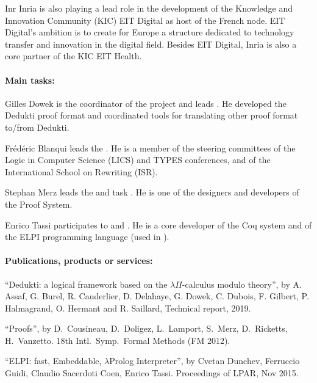 \begin{sitedescription}{Inr}
Inria is also playing a lead role in the development of the Knowledge and Innovation Community (KIC) EIT Digital as host of the French node. EIT Digital’s ambition is to create for Europe a structure dedicated to technology transfer and innovation in the digital field. Besides EIT Digital, Inria is also a core partner of the KIC EIT Health.

\paragraph*{Main tasks:}


\begin{compactitem}
\item Gilles Dowek is the coordinator of the project and leads
  . He developed the Dedukti proof format and
  coordinated tools for translating other proof format to/from
  Dedukti.
\item Frédéric Blanqui leads the . He is a member of the
  steering committees of the Logic in Computer Science (LICS) and
  TYPES conferences, and of the International School on Rewriting
  (ISR).
\item Stephan Merz leads the  and task .
  He is one of the designers and developers of the \tlaplus Proof System.
\item Enrico Tassi participates to  and . He is a core
developer of the Coq system and of the ELPI programming language (used in ).
\end{compactitem}

\paragraph*{Publications, products or services:}


\begin{compactitem}
\item ``Dedukti: a logical framework based on the $\lambda\Pi$-calculus modulo theory'', by A. Assaf, G. Burel, R. Cauderlier, D. Delahaye, G. Dowek, C. Dubois, F. Gilbert, P. Halmagrand, O. Hermant and R. Saillard, Technical report, 2019.
\item ``\tlaplus Proofs'', by D.\ Cousineau, D.\ Doligez, L.\ Lamport, S.\ Merz, D.\  Ricketts, H.\ Vanzetto. 18th Intl.\ Symp.\ Formal Methods (FM 2012).
\item ``ELPI: fast, Embeddable, $\lambda$Prolog Interpreter'', by Cvetan Dunchev, Ferruccio Guidi, Claudio Sacerdoti Coen, Enrico Tassi. Proceedings of LPAR, Nov 2015.
\end{compactitem}


\end{sitedescription}
